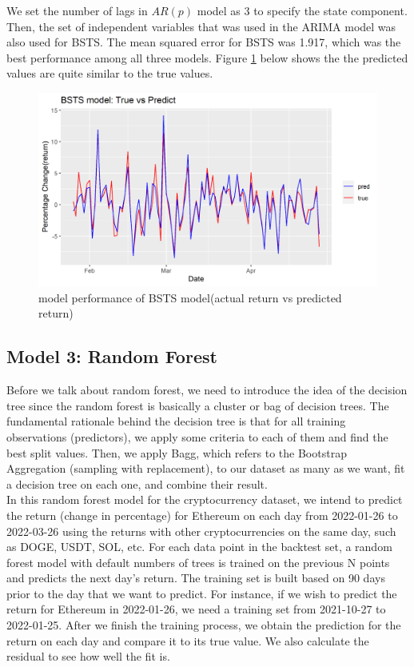 \documentclass{article}
\begin{document}
\noindent We set the number of lags in $AR(p)$ model as 3 to specify the state component. Then, the set of independent variables that was used in the ARIMA model was also used for BSTS. The mean squared error for BSTS was 1.917, which was the best performance among all three models. Figure \ref{fig: bsts_true_and_predict} below shows the the predicted values are quite similar to the true values.

\begin{figure}[H]
	\centering
	\includegraphics[width=16cm]{../figures/bsts_true_and_predict.png}
	\caption{model performance of BSTS model(actual return vs predicted return)}
	\label{fig: bsts_true_and_predict}
\end{figure}

\subsection{Model 3: Random Forest}

\noindent Before we talk about random forest, we need to introduce the idea of the decision tree since the random forest is basically a cluster or bag of decision trees. The fundamental rationale behind the decision tree is that for all training observations (predictors), we apply some criteria to each of them and find the best split values. Then, we apply Bagg, which refers to the  Bootstrap Aggregation (sampling with replacement), to our dataset as many as we want, fit a decision tree on each one, and combine their result. \\

\noindent In this random forest model for the cryptocurrency dataset, we intend to predict the return (change in percentage) for Ethereum on each day from 2022-01-26 to 2022-03-26 using the returns with other cryptocurrencies on the same day, such as DOGE, USDT, SOL, etc. For each data point in the backtest set, a random forest model with default numbers of trees is trained on the previous N points and predicts the next day’s return. The training set is built based on 90 days prior to the day that we want to predict. For instance, if we wish to predict the return for Ethereum in 2022-01-26, we need a training set from 2021-10-27 to 2022-01-25. After we finish the training process, we obtain the prediction for the return on each day and compare it to its true value. We also calculate the residual to see how well the fit is.\\
\end{document}
